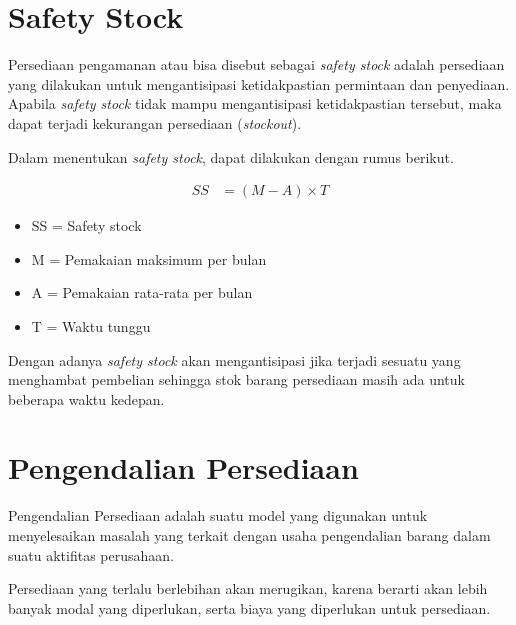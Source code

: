 


\section{Safety Stock}

Persediaan pengamanan atau bisa disebut sebagai  \textit{safety stock} adalah persediaan yang dilakukan untuk mengantisipasi ketidakpastian permintaan dan penyediaan. Apabila \textit{safety stock} tidak mampu mengantisipasi ketidakpastian tersebut, maka dapat terjadi kekurangan persediaan (\textit{stockout}).

Dalam menentukan \textit{safety stock}, dapat dilakukan dengan rumus berikut.

\begin{equation}
    \begin{split}
		SS
		&= (M - A) \times T 
    \end{split}
\end{equation}

\begin{itemize}
	\item SS = Safety stock
	\item M = Pemakaian maksimum per bulan
	\item A = Pemakaian rata-rata per bulan
	\item T = Waktu tunggu
\end{itemize}

Dengan adanya \textit{safety stock} akan mengantisipasi jika terjadi sesuatu yang menghambat pembelian sehingga stok barang persediaan masih ada untuk beberapa waktu kedepan.

\section{Pengendalian Persediaan}

Pengendalian Persediaan adalah suatu model yang digunakan untuk menyelesaikan masalah yang terkait dengan usaha pengendalian barang dalam suatu aktifitas perusahaan.

Persediaan yang terlalu berlebihan akan merugikan, karena berarti akan lebih banyak modal yang diperlukan, serta biaya yang diperlukan untuk persediaan.

